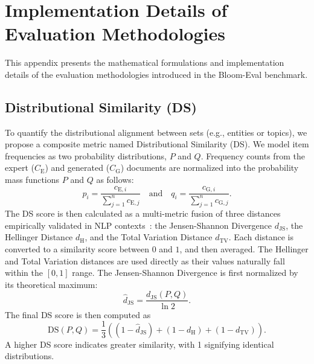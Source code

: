 \documentclass[11pt]{article}
\begin{document}
\appendix


\section{Implementation Details of Evaluation Methodologies}
\label{sec:detail_Evaluation_Methodologies}

This appendix presents the mathematical formulations and implementation details of the evaluation methodologies introduced in the Bloom-Eval benchmark.

\subsection{Distributional Similarity (DS)}
\label{sec:ds_metric}

To quantify the distributional alignment between sets (e.g., entities or topics), we propose a composite metric named Distributional Similarity (DS). We model item frequencies as two probability distributions, $P$ and $Q$. Frequency counts from the expert ($C_\text{E}$) and generated ($C_\text{G}$) documents are normalized into the probability mass functions $P$ and $Q$ as follows:
{
\setlength{\abovedisplayskip}{6pt}%
\setlength{\belowdisplayskip}{6pt}%
\begin{equation}
p_i = \frac{c_{\text{E},i}}{\sum_{j=1}^{n} c_{\text{E},j}} \quad \text{and} \quad q_i = \frac{c_{\text{G},i}}{\sum_{j=1}^{n} c_{\text{G},j}}.
\end{equation}
}
The DS score is then calculated as a multi-metric fusion of three distances empirically validated in NLP contexts~\cite{balandranocoronel2016using, lebret2014word, ji2023tailoring}: the Jensen-Shannon Divergence $d_{\mathrm{JS}}$, the Hellinger Distance $d_{\mathrm{H}}$, and the Total Variation Distance $d_{\mathrm{TV}}$. Each distance is converted to a similarity score between $0$ and $1$, and then averaged. The Hellinger and Total Variation distances are used directly as their values naturally fall within the $[0, 1]$ range. The Jensen-Shannon Divergence is first normalized by its theoretical maximum:
{
\setlength{\abovedisplayskip}{6pt}%
\setlength{\belowdisplayskip}{6pt}%
\begin{equation}
\hat{d}_{\mathrm{JS}} = \frac{d_{\mathrm{JS}}(P, Q)}{\ln 2}.
\end{equation}
}
The final DS score is then computed as
{
\setlength{\abovedisplayskip}{6pt}%
\setlength{\belowdisplayskip}{6pt}%
\begin{equation*}
\mathrm{DS}(P, Q) = \frac{1}{3} \left( (1 - \hat{d}_{\mathrm{JS}}) + (1 - d_{\mathrm{H}}) + (1 - d_{\mathrm{TV}}) \right).
\end{equation*}
}
A higher DS score indicates greater similarity, with 1 signifying identical distributions.
\end{document}
